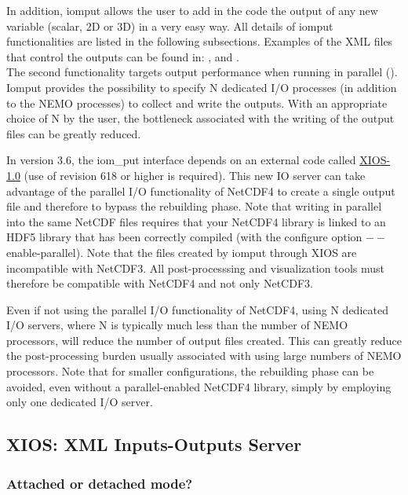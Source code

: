 \documentclass[../main/NEMO_manual]{subfiles}
\begin{document}
In addition, iomput allows the user to add in the code the output of any new variable (scalar, 2D or 3D)
in a very easy way.
All details of iomput functionalities are listed in the following subsections.
Examples of the XML files that control the outputs can be found in: ,
 and . \\

The second functionality targets output performance when running in parallel ().
Iomput provides the possibility to specify N dedicated I/O processes (in addition to the NEMO processes)
to collect and write the outputs.
With an appropriate choice of N by the user, the bottleneck associated with the writing of
the output files can be greatly reduced.

In version 3.6, the iom\_put interface depends on
an external code called \href{https://forge.ipsl.jussieu.fr/ioserver/browser/XIOS/branchs/xios-1.0}{XIOS-1.0} 
(use of revision 618 or higher is required).
This new IO server can take advantage of the parallel I/O functionality of NetCDF4 to
create a single output file and therefore to bypass the rebuilding phase.
Note that writing in parallel into the same NetCDF files requires that your NetCDF4 library is linked to
an HDF5 library that has been correctly compiled (\ie with the configure option $--$enable-parallel).
Note that the files created by iomput through XIOS are incompatible with NetCDF3.
All post-processsing and visualization tools must therefore be compatible with NetCDF4 and not only NetCDF3.

Even if not using the parallel I/O functionality of NetCDF4, using N dedicated I/O servers,
where N is typically much less than the number of NEMO processors, will reduce the number of output files created.
This can greatly reduce the post-processing burden usually associated with using large numbers of NEMO processors.
Note that for smaller configurations, the rebuilding phase can be avoided,
even without a parallel-enabled NetCDF4 library, simply by employing only one dedicated I/O server.

\subsection{XIOS: XML Inputs-Outputs Server}

\subsubsection{Attached or detached mode?}
\end{document}
